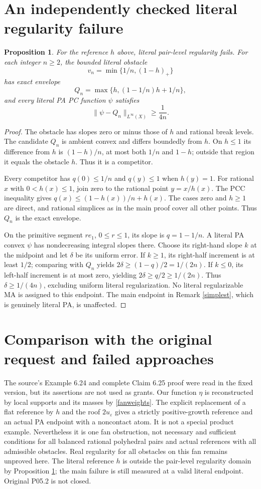 \documentclass[11pt]{article}
\newtheorem{proposition}[theorem]{Proposition}
\newcommand{\eps}{\varepsilon}
\begin{document}
\section{An independently checked literal regularity failure}
\begin{proposition}\label{literal}
For the reference $h$ above, literal pair-level regularity fails. For each integer $n\geq2$, the bounded literal obstacle
\[v_n=\min\{1/n,(1-h)_+\}\]
has exact envelope
\[Q_n=\max\{h,(1-1/n)h+1/n\},\]
and every literal PA PC function $\psi$ satisfies
\[\|\psi-Q_n\|_{L^\infty(X)}\geq\frac1{4n}.\]
\end{proposition}
\begin{proof}
The obstacle has slopes zero or minus those of $h$ and rational break levels. The candidate $Q_n$ is ambient convex and differs boundedly from $h$. On $h\leq1$ its difference from $h$ is $(1-h)/n$, at most both $1/n$ and $1-h$; outside that region it equals the obstacle $h$. Thus it is a competitor.

Every competitor has $q(0)\leq1/n$ and $q(y)\leq1$ when $h(y)=1$. For rational $x$ with $0<h(x)\leq1$, join zero to the rational point $y=x/h(x)$. The PCC inequality gives $q(x)\leq(1-h(x))/n+h(x)$. The cases zero and $h\geq1$ are direct, and rational simplices as in the main proof cover all other points. Thus $Q_n$ is the exact envelope.

On the primitive segment $r e_1$, $0\leq r\leq1$, its slope is $q=1-1/n$. A literal PA convex $\psi$ has nondecreasing integral slopes there. Choose its right-hand slope $k$ at the midpoint and let $\delta$ be its uniform error. If $k\geq1$, its right-half increment is at least $1/2$; comparing with $Q_n$ yields $2\delta\geq(1-q)/2=1/(2n)$. If $k\leq0$, its left-half increment is at most zero, yielding $2\delta\geq q/2\geq1/(2n)$. Thus $\delta\geq1/(4n)$, excluding uniform literal regularization. No literal regularizable MA is assigned to this endpoint. The main endpoint in Remark \ref{simplest}, which is genuinely literal PA, is unaffected.
\end{proof}

\section{Comparison with the original request and failed approaches}
The source's Example 6.24 and complete Claim 6.25 proof were read in the fixed version, but its assertions are not used as grants. Our function $\eta$ is reconstructed by local supports and its masses by \eqref{fanweights}. The explicit replacement of a flat reference by $h$ and the roof $2u_\eps$ gives a strictly positive-growth reference and an actual PA endpoint with a noncontact atom. It is not a special product example. Nevertheless it is one fan obstruction, not necessary and sufficient conditions for all balanced rational polyhedral pairs and actual references with all admissible obstacles. Real regularity for all obstacles on this fan remains unproved here. The literal reference $h$ is outside the pair-level regularity domain by Proposition \ref{literal}; the main failure is still measured at a valid literal endpoint. Original P05.2 is not closed.
\end{document}
